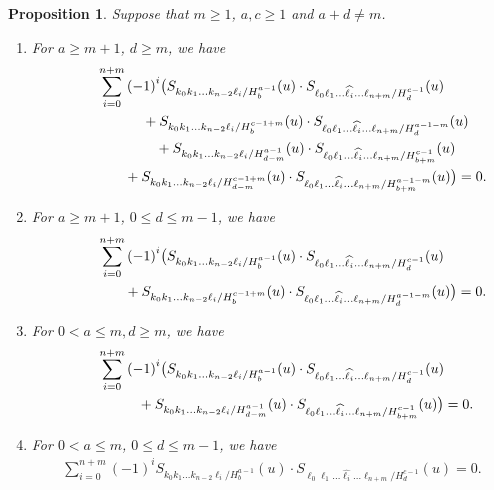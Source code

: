 \documentclass[pdftex]{sigma}
\numberwithin{equation}{section}
\newtheorem{Proposition}[Theorem]{Proposition}
 { \theoremstyle{definition}
\newtheorem{Definition}[Theorem]{Definition}
\newtheorem{Note}[Theorem]{Note}
\newtheorem{Example}[Theorem]{Example}
\newtheorem{Remark}[Theorem]{Remark} }
\begin{document}
\begin{Proposition}\label{abcd}
Suppose that $m\geq 1$, $a, c\geq 1$ and $a+d\ne m$.
\begin{enumerate}
\item[$(1)$] For $a\geq m+1$, $d\geq m$, we have
\begin{gather}
\sum_{i=0}^{n+m}{(-1)}^{i}\bigl(S_{k_0 k_1\dots k_{n-2}\ell_i/{H^{a-1}_{b}}}(u)\cdot S_{\ell_0 \ell_1\dots \widehat{\ell_{i}}\dots\ell_{n+m}/{H^{c-1}_{d}}}(u)\nonumber\\
\hphantom{\sum_{i=0}^{n+m}{(-1)}^{i}\bigl(}{}
+S_{k_0 k_1\dots k_{n-2}\ell_i/{H^{c-1+m}_{b}}}(u)\cdot S_{\ell_0 \ell_1\dots \widehat{\ell_{i}}\dots\ell_{n+m}/{H^{a-1-m}_{d}}}(u)\nonumber\\
\hphantom{\sum_{i=0}^{n+m}{(-1)}^{i}\bigl(}{}
+S_{k_0 k_1\dots k_{n-2}\ell_i/{H^{a-1}_{d-m}}}(u)\cdot S_{\ell_0 \ell_1\dots \widehat{\ell_{i}}\dots\ell_{n+m}/{H^{c-1}_{b+m}}}(u)\nonumber\\
\hphantom{\sum_{i=0}^{n+m}{(-1)}^{i}\bigl(}{}
+S_{k_0 k_1\dots k_{n-2}\ell_i/{H^{c-1+m}_{d-m}}}(u)\cdot S_{\ell_0 \ell_1\dots \widehat{\ell_{i}}\dots\ell_{n+m}/{H^{a-1-m}_{b+m}}}(u)\bigr)=0.\label{abcd1}
\end{gather}

\item[$(2)$] For $a\geq m+1$, $0\leq d\leq m-1$, we have
 \begin{gather}
\sum_{i=0}^{n+m}{(-1)}^{i}\bigl(S_{k_0 k_1\dots k_{n-2}\ell_i/{H^{a-1}_{b}}}(u)\cdot S_{\ell_0 \ell_1\dots \widehat{\ell_{i}}\dots\ell_{n+m}/{H^{c-1}_{d}}}(u)\nonumber\\
\hphantom{\sum_{i=0}^{n+m}{(-1)}^{i}\bigl(}{}
+S_{k_0 k_1\dots k_{n-2}\ell_i/{H^{c-1+m}_{b}}}(u)\cdot S_{\ell_0 \ell_1\dots \widehat{\ell_{i}}\dots\ell_{n+m}/{H^{a-1-m}_{d}}}(u)\bigr)=0.
\label{abcd2}
\end{gather}


\item[$(3)$] For $0<a\leq m,d\geq m$, we have
 \begin{gather}
\sum_{i=0}^{n+m}{(-1)}^{i}\bigl(S_{k_0 k_1\dots k_{n-2}\ell_i/{H^{a-1}_{b}}}(u)\cdot S_{\ell_0 \ell_1\dots \widehat{\ell_{i}}\dots\ell_{n+m}/{H^{c-1}_{d}}}(u)\nonumber\\
\hphantom{\sum_{i=0}^{n+m}{(-1)}^{i}\bigl(}{}
+S_{k_0 k_1\dots k_{n-2}\ell_i/{H^{a-1}_{d-m}}}(u)\cdot S_{\ell_0 \ell_1\dots \widehat{\ell_{i}}\dots\ell_{n+m}/{H^{c-1}_{b+m}}}(u)\bigr)=0.
\label{abcd3}
\end{gather}


\item[$(4)$] For $0<a\leq m$, $0\leq d\leq m-1$, we have
\begin{gather}
\sum_{i=0}^{n+m}{(-1)}^{i}S_{k_0 k_1\dots k_{n-2}\ell_i/{H^{a-1}_{b}}}(u)\cdot S_{\ell_0 \ell_1\dots \widehat{\ell_{i}}\dots\ell_{n+m}/{H^{c-1}_{d}}}(u)=0.
\label{abcd4}
\end{gather}
\end{enumerate}
\end{Proposition}
\end{document}
